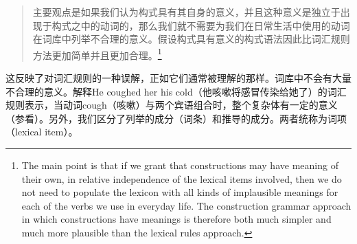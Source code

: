\begin{quote}
主要观点是如果我们认为构式具有其自身的意义，并且这种意义是独立于出现于构式之中的动词的，那么我们就不需要为我们在日常生活中使用的动词在词库中列举不合理的意义。假设构式具有意义的构式语法因此比词汇规则方法更加简单并且更加合理。\citep[]{Tomasello2003a}\footnote{%
The main point is that if we grant that constructions may have meaning of their own, in relative
independence of the lexical items involved, then we do not need to populate the lexicon with all
kinds of implausible meanings for each of the verbs we use in everyday life.  The construction
grammar approach in which constructions have meanings is therefore both much simpler and much more plausible than the lexical rules approach.}
\end{quote}

\noindent
这反映了对词汇规则的一种误解，正如它们通常被理解的那样。词库中不会有大量不合理的意义。解释He coughed her his cold（他咳嗽将感冒传染给她了）的词汇规则表示，当动词cough（咳嗽）与两个宾语组合时，整个复杂体有一定的意义（参看\citealp[]{Mueller2006d}）。另外，我们区分了列举的成分（词条）和推导的成分。两者统称为词项（lexical item）。

